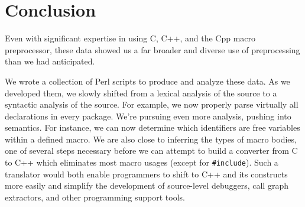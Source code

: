 \documentclass[11pt]{article}
\begin{document}
\section{Conclusion}
\label{sec:discussion}

Even with significant expertise in using C, C++, and the Cpp macro
preprocessor, these data showed us a far broader and diverse use of
preprocessing than we had anticipated.  

We wrote a collection of Perl scripts to produce and analyze these data.
As we developed them, we slowly shifted from a lexical analysis of the
source to a syntactic analysis of the source.  For example, we now properly
parse virtually all declarations in every package.  We're pursuing even
more analysis, pushing into semantics.  For instance, we can now determine
which identifiers are free variables within a defined macro.  We are also
close to inferring the types of macro bodies, one of several steps
necessary before we can attempt to build a converter from C to C++ which
eliminates most macro usages (except for {\tt \#include}).  Such a
translator would both enable programmers to shift to C++ and its constructs
more easily and simplify the development of source-level debuggers,
call graph extractors, and other programming support tools.

%

{\small }
\end{document}
